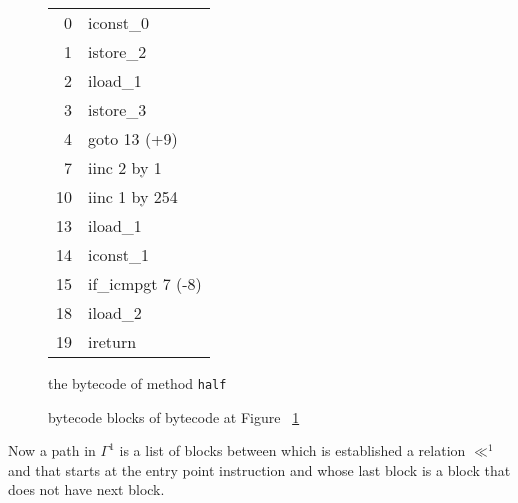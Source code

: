 \begin{figure}[p]
\begin{center}
\begin{tabular}{rl}
 0 & iconst\_0\\ 
 1 & istore\_2\\
 2 & iload\_1\\
 3 & istore\_3\\%
 4 & goto 13 (+9)\\%
 7 & iinc 2 by 1\\%
10 & iinc 1 by 254\\%
13 & iload\_1\\%
14 & iconst\_1\\%
15 & if\_icmpgt 7 (-8)\\%
18 & iload\_2\\%
19 & ireturn\\%
\end{tabular}
\end{center}
\caption{the bytecode of method \texttt{half}}
\label{halfBC}
\end{figure}

\begin{figure}[p]
\begin{center}
\end{center}
\caption{bytecode blocks of bytecode at Figure ~\ref{halfBC}}
\label{blockBC}
\end{figure}

Now a path in $\Gamma^1$  is a list of blocks between which is established a relation $\ll^1$ and that starts at the entry point instruction and whose last block is a block that does not have next block.



